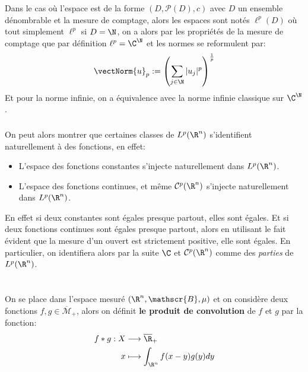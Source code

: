 \subsection*{}
Dans le cas où l'espace est de la forme \( (D, \mathscr{P}(D), c) \) avec \( D \) un ensemble dénombrable et la mesure de comptage, alors les espaces sont notés \( \ell^p(D) \) où tout simplement \( \ell^p \) si \( D = \N \), on a alors par les propriétés de la mesure de comptage que par définition \( \ell^p = \C^\N \) et les normes se reformulent par:
\[ 
   \vectNorm{u}_p := \left (\sum_{j \in \N} |u_j|^p \right )^{\frac{1}{p}}
\]
Et pour la norme infinie, on a équivalence avec la norme infinie classique sur \( \C^\N \).
\subsection*{}
On peut alors montrer que certaines classes de \( L^p(\R^n) \) s'identifient naturellement à des fonctions, en effet:
\begin{itemize}
   \item L'espace des fonctions constantes s'injecte naturellement dans \( L^p( \R^n) \).
   \item L'espace des fonctions continues, et même \(  \mathcal{C}^p(\R^n) \) s'injecte naturellement dans \( L^p( \R^n) \).
\end{itemize}
En effet si deux constantes sont égales presque partout, elles sont égales. Et si deux fonctions continues sont égales presque partout, alors en utilisant le fait évident que la mesure d'un ouvert est strictement positive, elle sont égales. En particulier, on identifiera alors par la suite \( \C \) et \(  \mathcal{C}^p( \R^n) \) comme des \textit{parties} de \( L^p( \R^n) \).

\chapter*{} %
On se place dans l'espace mesuré \( (\R^n, \mathscr{B}, \mu) \) et on considère deux fonctions \( f, g \in \overline{\mathscr{M}}_+ \), alors on définit \textbf{le produit de convolution} de \( f \) et \( g \) par la fonction:
\[ 
   \begin{aligned}
      f * g : X &\longrightarrow \overline{\R}_+ \\
      x &\longmapsto \int_{\R^n} f(x - y)g(y) dy 
   \end{aligned}
\]
